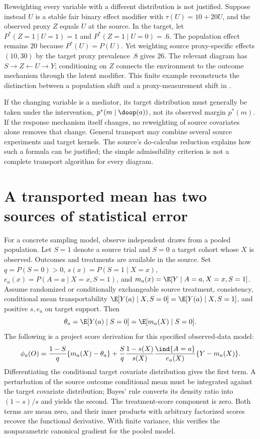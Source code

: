 Reweighting every variable with a different distribution is not
justified. Suppose instead $U$ is a stable fair binary effect modifier
with $\tau(U)=10+20U$, and the observed proxy $Z$ equals $U$ at the
source. In the target, let $P^*(Z=1\mid U=1)=1$ and
$P^*(Z=1\mid U=0)=.6$. The population effect remains $20$ because
$P^*(U)=P(U)$. Yet weighting source proxy-specific effects $(10,30)$
by the target proxy prevalence $.8$ gives $26$. The relevant diagram
has $S\to Z\leftarrow U\to Y$; conditioning on $Z$ connects the
environment to the outcome mechanism through the latent modifier.
This finite example reconstructs the distinction between a population
shift and a proxy-measurement shift in
\citet[Section 3, Examples 1--2]{pearltransport2014}.

If the changing variable is a mediator, its target distribution must
generally be taken under the intervention, $p^*(m\mid\doop(a))$,
not its observed margin $p^*(m)$. If the response mechanism itself
changes, no reweighting of source covariates alone removes that change.
General transport may combine several source experiments and target
kernels. The source's do-calculus reduction explains how such a
formula can be justified; the simple admissibility criterion is not
a complete transport algorithm for every diagram.

\section{A transported mean has two sources of statistical error}
\label{r3:transport-gradient}
For a concrete sampling model, observe independent draws from a pooled
population. Let $S=1$ denote a source trial and $S=0$ a target cohort
whose $X$ is observed. Outcomes and treatments are available in the
source. Set $q=P(S=0)>0$, $s(x)=P(S=1\mid X=x)$,
$e_a(x)=P(A=a\mid X=x,S=1)$, and
$m_a(x)=\E[Y\mid A=a,X=x,S=1]$. Assume randomized or conditionally
exchangeable source treatment, consistency, conditional mean
transportability $\E[Y(a)\mid X,S=0]=\E[Y(a)\mid X,S=1]$,
and positive $s,e_a$ on target support. Then
\[
 \theta_a=\E[Y(a)\mid S=0]=\E[m_a(X)\mid S=0].
\]
The following is a project score derivation for this specified
observed-data model:
\begin{equation}
 \phi_a(O)=\frac{1-S}{q}\{m_a(X)-\theta_a\}
 +\frac{S}{q}\frac{1-s(X)}{s(X)}
          \frac{\ind\{A=a\}}{e_a(X)}\{Y-m_a(X)\}.
 \label{r3:transport-if}
\end{equation}
Differentiating the conditional target covariate distribution gives
the first term. A perturbation of the source outcome conditional
mean must be integrated against the target covariate distribution;
Bayes' rule converts its density ratio into $(1-s)/s$ and yields
the second. The treatment-score component is zero. Both terms are
mean zero, and their inner products with arbitrary factorized scores
recover the functional derivative. With finite variance, this
verifies the nonparametric canonical gradient for the pooled model.

